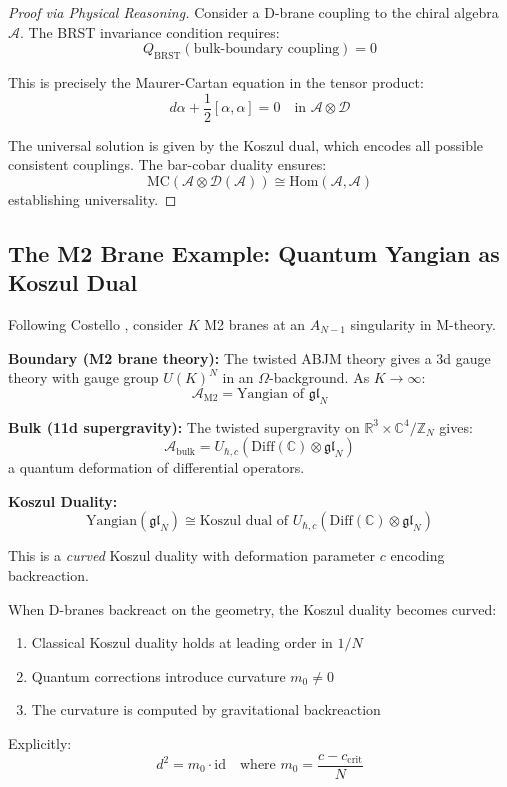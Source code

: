\begin{proof}[Proof via Physical Reasoning]
Consider a D-brane coupling to the chiral algebra $\mathcal{A}$. The BRST invariance condition requires:
$$Q_{\text{BRST}}(\text{bulk-boundary coupling}) = 0$$

This is precisely the Maurer-Cartan equation in the tensor product:
$$d\alpha + \frac{1}{2}[\alpha, \alpha] = 0 \quad \text{in } \mathcal{A} \otimes \mathcal{D}$$

The universal solution is given by the Koszul dual, which encodes all possible consistent couplings. The bar-cobar duality ensures:
$$\text{MC}(\mathcal{A} \otimes \mathcal{D}(\mathcal{A})) \cong \text{Hom}(\mathcal{A}, \mathcal{A})$$
establishing universality.
\end{proof}

\subsection{The M2 Brane Example: Quantum Yangian as Koszul Dual}

\begin{example}\label{ex:M2-brane}
Following Costello \cite{Costello2017}, consider $K$ M2 branes at an $A_{N-1}$ singularity in M-theory.

\textbf{Boundary (M2 brane theory):}
The twisted ABJM theory gives a 3d gauge theory with gauge group $U(K)^N$ in an $\Omega$-background. As $K \to \infty$:
$$\mathcal{A}_{\text{M2}} = \text{Yangian of } \mathfrak{gl}_N$$

\textbf{Bulk (11d supergravity):}
The twisted supergravity on $\mathbb{R}^3 \times \mathbb{C}^4/\mathbb{Z}_N$ gives:
$$\mathcal{A}_{\text{bulk}} = U_{\hbar,c}(\text{Diff}(\mathbb{C}) \otimes \mathfrak{gl}_N)$$
a quantum deformation of differential operators.

\textbf{Koszul Duality:}
$$\boxed{\text{Yangian}(\mathfrak{gl}_N) \cong \text{Koszul dual of } U_{\hbar,c}(\text{Diff}(\mathbb{C}) \otimes \mathfrak{gl}_N)}$$

This is a \emph{curved} Koszul duality with deformation parameter $c$ encoding backreaction.
\end{example}

\begin{theorem}\label{thm:curved-koszul}
When D-branes backreact on the geometry, the Koszul duality becomes curved:
\begin{enumerate}
\item Classical Koszul duality holds at leading order in $1/N$
\item Quantum corrections introduce curvature $m_0 \neq 0$
\item The curvature is computed by gravitational backreaction
\end{enumerate}

Explicitly:
$$d^2 = m_0 \cdot \text{id} \quad \text{where } m_0 = \frac{c - c_{\text{crit}}}{N}$$
\end{theorem}

